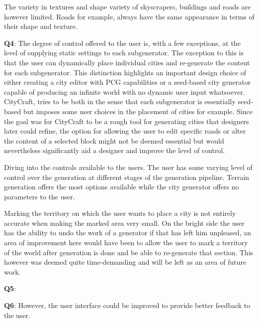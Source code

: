 The variety in textures and shape variety of skyscrapers, buildings and roads are however limited.
Roads for example, always have the same appearance in terms of their shape and texture.

\textbf{Q4}: \newline
The degree of control offered to the user is, with a few exceptions, at the level of supplying static settings to each subgenerator.
The exception to this is that the user can dynamically place individual cities and re-generate the content for each subgenerator.
This distinction highlights an important design choice of either creating a city editor with PCG capabilities or a seed-based city generator capable of producing an infinite world with no dynamic user input whatsoever.
CityCraft, tries to be both in the sense that each subgenerator is essentially seed-based but imposes some user choices in the placement of cities for example.
Since the goal was for CityCraft to be a rough tool for generating cities that designers later could refine, the option for allowing the user to edit specific roads or alter the content of a selected block might not be deemed essential but would nevertheless significantly aid a designer and improve the level of control.

Diving into the controls available to the users.
The user has some varying level of control over the generation at different stages of the generation pipeline.
Terrain generation offers the most options available while the city generator offers no parameters to the user. 

Marking the territory on which the user wants to place a city is not entirely accurate when making the marked area very small. 
On the bright side the user has the ability to undo the work of a generator if that has left him unpleased, an area of improvement here would have been to allow the user to mark a territory of the world after generation is done and be able to re-generate that section.
This however was deemed quite time-demanding and will be left as an area of future work. 

\textbf{Q5}: \newline


\textbf{Q6}: \newline
However, the user interface could be improved to provide better feedback to the user.


